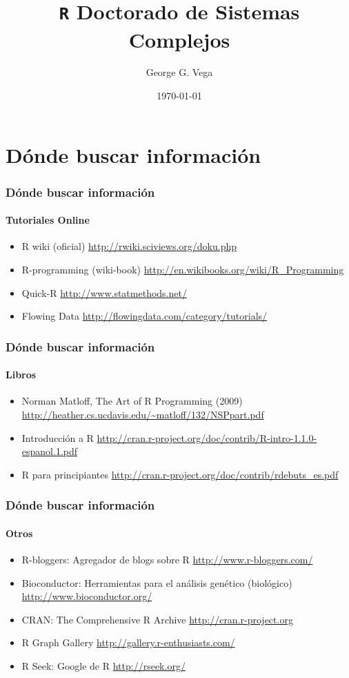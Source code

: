 \documentclass[10pt, letterpaper]{beamer}\usepackage{graphicx, color}
\title[{\tt R}-UAI]{{\tt R} Doctorado de Sistemas Complejos}
\author[GGV]{George G. Vega}
\institute[SPensiones]{Superintendencia de Pensiones}
\date{\today}
\begin{document}
\frame{\maketitle}






\section{D\'onde buscar informaci\'on}

\begin{frame}
\frametitle{D\'onde buscar informaci\'on}
\framesubtitle{Tutoriales Online}
\begin{itemize}
\item R wiki (oficial) \url{http://rwiki.sciviews.org/doku.php}
\item R-programming (wiki-book) \url{http://en.wikibooks.org/wiki/R_Programming}
\item Quick-R \url{http://www.statmethods.net/}
\item Flowing Data \url{http://flowingdata.com/category/tutorials/}
\end{itemize}
\end{frame}

\begin{frame}
\frametitle{D\'onde buscar informaci\'on}
\framesubtitle{Libros}
\begin{itemize}
\item Norman Matloff, The Art of R Programming (2009) \url{http://heather.cs.ucdavis.edu/~matloff/132/NSPpart.pdf}
\item Introducci\'on a R \url{http://cran.r-project.org/doc/contrib/R-intro-1.1.0-espanol.1.pdf}
\item R para principiantes \url{http://cran.r-project.org/doc/contrib/rdebuts_es.pdf}
\end{itemize}
\end{frame}

\begin{frame}
\frametitle{D\'onde buscar informaci\'on}
\framesubtitle{Otros}
\begin{itemize}
\item R-bloggers: Agregador de blogs sobre R \url{http://www.r-bloggers.com/}
\item Bioconductor: Herramientas para el an\'alisis gen\'etico (biol\'ogico) \url{http://www.bioconductor.org/}
\item CRAN: The Comprehensive R Archive \url{http://cran.r-project.org}
\item R Graph Gallery \url{http://gallery.r-enthusiasts.com/}
\item R Seek: Google de R \url{http://rseek.org/}
\end{itemize}
\end{frame}
\end{document}
